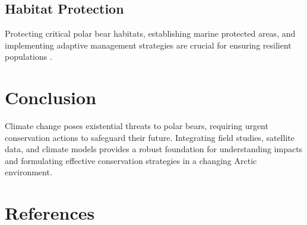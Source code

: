 \documentclass[12pt]{article}
\begin{document}
\subsection{Habitat Protection}
Protecting critical polar bear habitats, establishing marine protected areas, and implementing adaptive management strategies are crucial for ensuring resilient populations \citep{joint2013polar, dabbs2015polar}.

\section{Conclusion}
Climate change poses existential threats to polar bears, requiring urgent conservation actions to safeguard their future. Integrating field studies, satellite data, and climate models provides a robust foundation for understanding impacts and formulating effective conservation strategies in a changing Arctic environment.

\section*{References}


\end{document}
